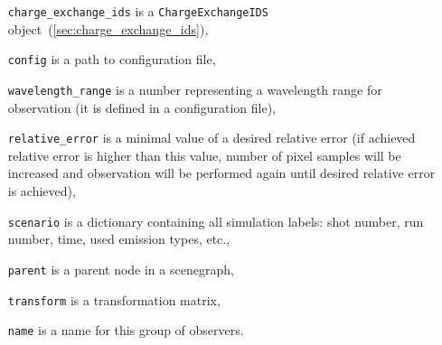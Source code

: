 \documentclass[../../main]{subfiles}
\begin{document}
\begin{itemize}[align=left]
    \item[\texttt{charge\_exchange\_ids}] is a \texttt{ChargeExchangeIDS} object~(\cref{sec:charge_exchange_ids}),
    \item[\texttt{config}] is a path to configuration file,
    \item[\texttt{wavelength\_range}] is a number representing a wavelength range for observation (it is defined in a configuration file),
    \item[\texttt{relative\_error}] is a minimal value of a desired relative error (if achieved relative error is higher than this value, number of pixel samples will be increased and observation will be performed again until desired relative error is achieved),
    \item[\texttt{scenario}] is a dictionary containing all simulation labels: shot number, run number, time, used emission types, etc.,
    \item[\texttt{parent}] is a parent node in a scenegraph,
    \item[\texttt{transform}] is a transformation matrix,
    \item[\texttt{name}] is a name for this group of observers.
\end{itemize}
\end{document}

